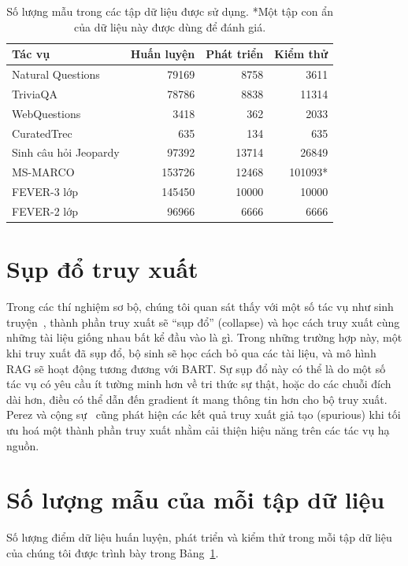 \documentclass[10pt,letterpaper]{article}
\begin{document}
\begin{table}[t]
\caption{Số lượng mẫu trong các tập dữ liệu được sử dụng. *Một tập con ẩn của
dữ liệu này được dùng để đánh giá.}
\label{tab:datasets}
\centering\small
\begin{tabular}{@{}lrrr@{}}
  \toprule
  Tác vụ & Huấn luyện & Phát triển & Kiểm thử\\
  \midrule
  Natural Questions & 79169 & 8758 & 3611\\
  TriviaQA & 78786 & 8838 & 11314\\
  WebQuestions & 3418 & 362 & 2033\\
  CuratedTrec & 635 & 134 & 635\\
  Sinh câu hỏi Jeopardy & 97392 & 13714 & 26849\\
  MS-MARCO & 153726 & 12468 & 101093*\\
  FEVER-3 lớp & 145450 & 10000 & 10000\\
  FEVER-2 lớp & 96966 & 6666 & 6666\\
  \bottomrule
\end{tabular}
\end{table}

\section{Sụp đổ truy xuất}

Trong các thí nghiệm sơ bộ, chúng tôi quan sát thấy với một số tác vụ như sinh
truyện~\cite{b11}, thành phần truy xuất sẽ ``sụp đổ'' (collapse) và học cách
truy xuất cùng những tài liệu giống nhau bất kể đầu vào là gì. Trong những
trường hợp này, một khi truy xuất đã sụp đổ, bộ sinh sẽ học cách bỏ qua các tài
liệu, và mô hình RAG sẽ hoạt động tương đương với BART. Sự sụp đổ này có thể là
do một số tác vụ có yêu cầu ít tường minh hơn về tri thức sự thật, hoặc do các
chuỗi đích dài hơn, điều có thể dẫn đến gradient ít mang thông tin hơn cho bộ
truy xuất. Perez và cộng sự~\cite{b46} cũng phát hiện các kết quả truy xuất
giả tạo (spurious) khi tối ưu hoá một thành phần truy xuất nhằm cải thiện hiệu
năng trên các tác vụ hạ nguồn.

\section{Số lượng mẫu của mỗi tập dữ liệu}

Số lượng điểm dữ liệu huấn luyện, phát triển và kiểm thử trong mỗi tập dữ liệu
của chúng tôi được trình bày trong Bảng~\ref{tab:datasets}.
\end{document}
